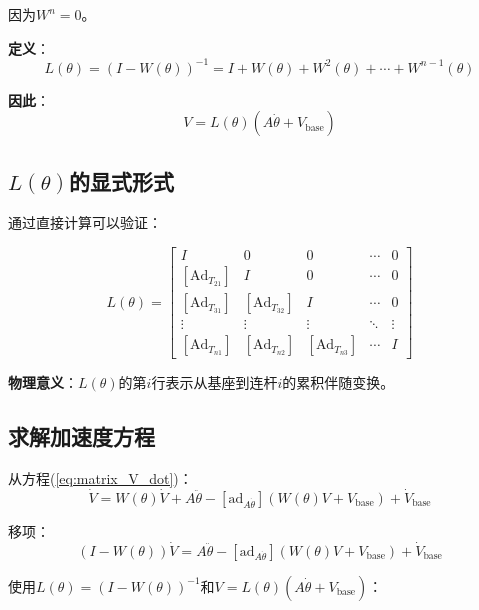 \documentclass[12pt,a4paper]{article}
\begin{document}
因为$W^n = 0$。

\textbf{定义}：
\begin{equation}
L(\theta) = (I - W(\theta))^{-1} = I + W(\theta) + W^2(\theta) + \cdots + W^{n-1}(\theta)
\label{eq:matrix_L}
\end{equation}

\textbf{因此}：
\begin{equation}
V = L(\theta)(A\dot{\theta} + V_{\text{base}})
\label{eq:V_solved}
\end{equation}

\subsection{$L(\theta)$的显式形式}

通过直接计算可以验证：

\begin{equation}
L(\theta) = \begin{bmatrix}
I & 0 & 0 & \cdots & 0 \\
[\text{Ad}_{T_{21}}] & I & 0 & \cdots & 0 \\
[\text{Ad}_{T_{31}}] & [\text{Ad}_{T_{32}}] & I & \cdots & 0 \\
\vdots & \vdots & \vdots & \ddots & \vdots \\
[\text{Ad}_{T_{n1}}] & [\text{Ad}_{T_{n2}}] & [\text{Ad}_{T_{n3}}] & \cdots & I
\end{bmatrix}
\label{eq:L_explicit}
\end{equation}

\textbf{物理意义}：$L(\theta)$的第$i$行表示从基座到连杆$i$的累积伴随变换。

\subsection{求解加速度方程}

从方程(\ref{eq:matrix_V_dot})：
\begin{equation}
\dot{V} = W(\theta)\dot{V} + A\ddot{\theta} - [\text{ad}_{A\dot{\theta}}](W(\theta)V + V_{\text{base}}) + \dot{V}_{\text{base}}
\end{equation}

移项：
\begin{equation}
(I - W(\theta))\dot{V} = A\ddot{\theta} - [\text{ad}_{A\dot{\theta}}](W(\theta)V + V_{\text{base}}) + \dot{V}_{\text{base}}
\end{equation}

使用$L(\theta) = (I - W(\theta))^{-1}$和$V = L(\theta)(A\dot{\theta} + V_{\text{base}})$：
\end{document}

